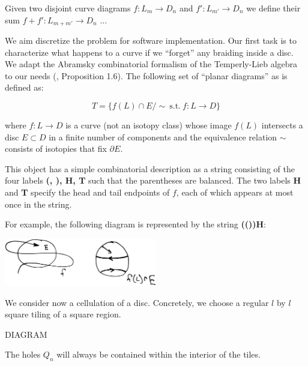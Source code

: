 \documentclass[12pt,a4paper]{article}
\begin{document}

Given two disjoint curve diagrams $f:L_m\to D_n$ and $f':L_{m'}\to D_n$
we define their sum  $f+f':L_{m+m'}\to D_n$ ...




We aim discretize the problem for software implementation.
Our first task is to characterize what happens to a curve
if we ``forget'' any braiding inside a disc.
We adapt the Abramsky combinatorial formalism 
of the Temperly-Lieb algebra to our needs (\cite{Abramsky08}, Proposition 1.6).
The following set of ``planar diagrams'' as is defined as:

    $$ T = \{ f(L)\cap E / \sim \ \text{s.t.}\ f:L\to D \}$$

where $f:L\to D$ is a curve (not an isotopy class)
whose image $f(L)$ intersects a disc $E\subset D$ in a finite number of components
and the equivalence relation $\sim$ consists of 
isotopies that fix $\partial E.$ %

This object has a simple combinatorial description 
as a string consisting of
the four labels {\bf (, ), H, T} such that 
the parentheses are balanced. The two labels {\bf H} and {\bf T} specify the
head and tail endpoints of $f$, each of which appears at most once in the string.

For example, the following diagram is represented by
the string {\bf(())H}:

\begin{center}
\includegraphics[width=0.5\textwidth]{planar.eps}
\end{center}



We consider now a cellulation of a disc.
Concretely, we choose a regular $l$ by $l$ square tiling of a square region.

DIAGRAM

The holes $Q_n$ will always be contained within the interior of the
tiles.
\end{document}
